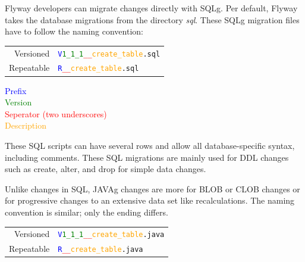 %
Flyway developers can migrate changes directly with \gls{SQLg}. Per default, Flyway takes the database migrations from the directory \textit{sql}.
These \gls{SQLg} migration files have to follow the naming convention:

\begin{center}
\begin{tabularx}{8cm}{r l}
Versioned & \texttt{\textcolor{blue}{V}\textcolor{green}{1\_1\_1}\textcolor{red}{\_\_}\textcolor{orange}{create\_table}.sql}\\
Repeatable & \texttt{\textcolor{blue}{R}\textcolor{red}{\_\_}\textcolor{orange}{create\_table}.sql}\\
\end{tabularx}
\end{center}

\begin{flushright}
\textcolor{blue}{Prefix}\\
\textcolor{green}{Version}\\
\textcolor{red}{Seperator (two underscores)}\\
\textcolor{orange}{Description}\\
\end{flushright}


These \gls{SQL} scripts can have several rows and allow all database-specific syntax, including comments. These \gls{SQL} migrations are mainly used for DDL changes such as create, alter, and drop for simple data changes.

%
Unlike changes in \gls{SQL}, \gls{JAVAg} changes are more for BLOB or CLOB changes or for progressive changes to an extensive data set like recalculations. The naming convention is similar; only the ending differs.


\begin{center}
	\begin{tabularx}{8cm}{r l}
		Versioned & \texttt{\textcolor{blue}{V}\textcolor{green}{1\_1\_1}\textcolor{red}{\_\_}\textcolor{orange}{create\_table}.java}\\
		Repeatable & \texttt{\textcolor{blue}{R}\textcolor{red}{\_\_}\textcolor{orange}{create\_table}.java}\\
	\end{tabularx}
\end{center}

